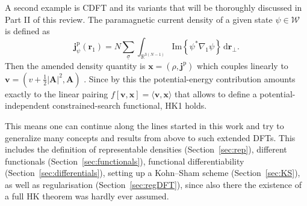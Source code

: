\documentclass[journal=apcach,manuscript=article,layout=twocolumn]{achemso}
\renewcommand{\d}{\,\mathrm{d}} %
\newcommand{\psispace}{\mathcal{W}}
\newcommand{\xx}{\mathbf{x}}
\newcommand{\rr}{\mathbf{r}}
\newcommand{\rrtwotoN}{\mathbf{r}_\perp}
\newcommand{\sigmaN}{\underline{\sigma}}
\newcommand{\vv}{\mathbf{v}}
\newcommand{\jpara}{\mathbf{j}^\mathrm{p}}
\begin{document}
A second example is CDFT and its variants that will be thoroughly discussed in Part II of this review. The paramagnetic current density of a given state $\psi \in \psispace$ is defined as
\begin{equation*}
        \jpara_\psi(\rr_1) =N \sum_{\sigmaN} \int_{\mathbb R^{3(N-1)}} \mathrm{Im}\left\{ \psi^*\nabla_1\psi \right\} \d \rrtwotoN.
\end{equation*}
Then the amended density quantity is $\xx=(\rho,\jpara)$ which couples linearly to $\vv=(v + \frac{1}{2}|\mathbf{A}|^2, \mathbf{A})$ \cite{Vignale1987}.
%
Since by this the potential-energy contribution amounts exactly to the linear pairing $f[\vv,\xx] = \langle \vv,\xx \rangle$ that allows to define a potential-independent constrained-search functional, HK1 holds.

This means one can continue along the lines started in this work and try to generalize many concepts and results from above to such extended DFTs. This includes the definition of representable densities (Section~\ref{sec:rep}), different functionals (Section~\ref{sec:functionals}), functional differentiability (Section~\ref{sec:differentials}), setting up a Kohn--Sham scheme (Section~\ref{sec:KS}), as well as regularisation (Section~\ref{sec:regDFT}), since also there the existence of a full HK theorem was hardly ever assumed.
\end{document}
